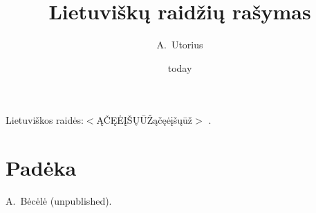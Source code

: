 \documentclass{article}
\begin{document}
\author{A.\ Utorius}
\title{Lietuvi{\v s}kų raid{\v z}ių ra{\v s}ymas}
\date{today}

\maketitle

Lietuviškos raid{\.e}s:$<$ĄČĘĖĮŠŲŪŽąčęėįšųūž$>$ \cite{ref1}.

\section*{Padėka}

\textit{}

\begin{thebibliography}{99}
 A.\ Bėcėlė (unpublished).
\end{thebibliography}
\end{document}
